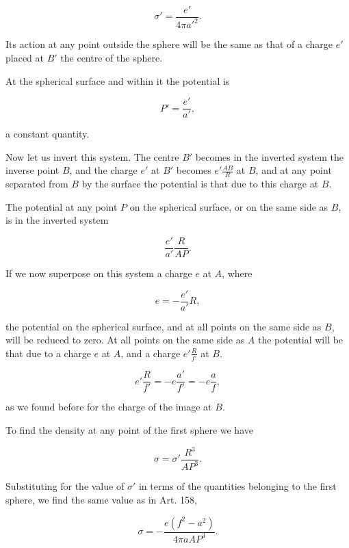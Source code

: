 \documentclass[11pt,a4paper]{article}
\begin{document}
\begin{equation}\tag{21}
\sigma' = \frac{e'}{4\pi a'^2}.
\end{equation}

Its action at any point outside the sphere will be the same as that of
a charge $e'$ placed at $B'$ the centre of the sphere.

At the spherical surface and within it the potential is

\begin{equation}\tag{22}
P' = \frac{e'}{a'},
\end{equation}

a constant quantity.

Now let us invert this system. The centre $B'$ becomes in the inverted
system the inverse point $B$, and the charge $e'$ at $B'$ becomes
$e'\frac{AB}{R}$ at $B$, and at any point separated from $B$ by the
surface the potential is that due to this charge at $B$.

The potential at any point $P$ on the spherical surface, or on the same
side as $B$, is in the inverted system

\[
\frac{e'}{a'}\frac{R}{AP}.
\]

If we now superpose on this system a charge $e$ at $A$, where

\begin{equation}\tag{23}
e = -\frac{e'}{a'}R,
\end{equation}

the potential on the spherical surface, and at all points on the same
side as $B$, will be reduced to zero. At all points on the same side
as $A$ the potential will be that due to a charge $e$ at $A$, and a
charge $e'\frac{R}{f'}$ at $B$.

\begin{equation}\tag{24}
e'\frac{R}{f'}=-e\frac{a'}{f'}=-e\frac{a}{f},
\end{equation}

as we found before for the charge of the image at $B$.

To find the density at any point of the first sphere we have

\begin{equation}\tag{25}
\sigma=\sigma'\frac{R^3}{AP^3}.
\end{equation}

Substituting for the value of $\sigma'$ in terms of the quantities
belonging to the first sphere, we find the same value as in Art. 158,

\begin{equation}\tag{26}
\sigma=-\frac{e(f^2-a^2)}{4\pi aAP^3}.
\end{equation}
\end{document}
